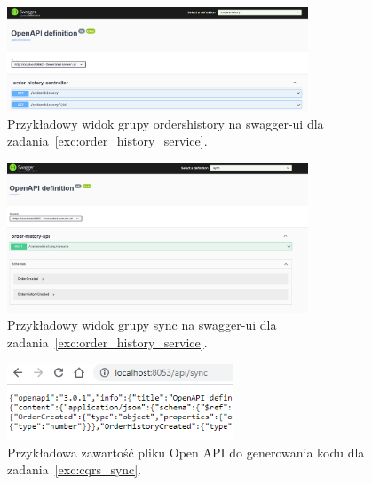 \documentclass[12pt]{article}
\begin{document}
    \begin{figure}[p]
        \centering
        \includegraphics[width=0.8\textwidth]{lista-3-2-a}
        \caption{Przykładowy widok grupy ordershistory na swagger-ui dla zadania~\ref{exc:order_history_service}.}
        \label{fig:swagger-orders-gr}
    \end{figure}  
    \begin{figure}[p]
        \centering
        \includegraphics[width=0.8\textwidth]{lista-3-2-b}
        \caption{Przykładowy widok grupy sync na swagger-ui dla zadania~\ref{exc:order_history_service}.}
        \label{fig:swagger-sync-gr}
    \end{figure}
    \begin{figure}[p]
        \centering
        \includegraphics[width=0.6\textwidth]{lista-3-3-a}
        \caption{Przykładowa zawartość pliku Open API do generowania kodu dla zadania~\ref{exc:cqrs_sync}.}
        \label{fig:openapi-gen}
    \end{figure}
\end{document}
